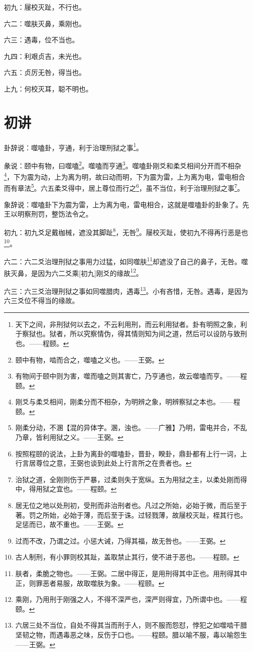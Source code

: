 \documentclass[12pt,oneside]{book}
\begin{document}
初九：屦校灭趾，不行也。

六二：噬肤灭鼻，乘刚也。

六三：遇毒，位不当也。

九四：利艰贞吉，未光也。

六五：贞厉无咎，得当也。

上九：何校灭耳，聪不明也。

\section{初讲}
卦辞说：噬嗑卦，亨通，利于治理刑狱之事\footnote{天下之间，非刑狱何以去之，不云利用刑，而云利用狱者。卦有明照之象，利于察狱也。狱者，所以究察情伪，得其情则知为间之道，然后可以设防与致刑也。——程颐。}。

彖说：颐中有物，曰噬嗑\footnote{颐中有物，啮而合之，噬嗑之义也。——王弼。}。噬嗑而亨通\footnote{有物间于颐中则为害，噬而嗑之则其害亡，乃亨通也，故云噬嗑而亨。——程颐。}。噬嗑卦刚爻和柔爻相间分开而不相杂\footnote{刚爻与柔爻相间，刚柔分而不相杂，为明辨之象，明辨察狱之本也。——程颐。}，下为震为动，上为离为明，故曰动而明，下为震为雷，上为离为电，雷电相合而有章法\footnote{刚柔分动，不溷【混的异体字。溷，浊也。——广雅】乃明，雷电并合，不乱乃章，皆利用狱之义。——王弼。}。六五柔爻得中，居上尊位而行之\footnote{按照程颐的说法，上卦为离卦的噬嗑卦，晋卦，睽卦，鼎卦都有上行一词，上行言居尊位之意，王弼也谈到此处上行言所之在贵者也。}，虽不当位，利于治理刑狱之事\footnote{治狱之道，全刚则伤于严暴，过柔则失于宽纵。五为用狱之主，以柔处刚而得中，得用狱之宜也。——程颐。}。

象辞说：噬嗑卦下为震为雷，上为离为电，雷电相合，这就是噬嗑卦的卦象了。先王以明察刑罚，整饬法令之。

初九：初九爻足戴枷械，遮没其脚趾\footnote{居无位之地以处刑初，受刑而非治刑者也。凡过之所始，必始于微，而后至于著。罚之所始，必始于薄，而后至于诛。过轻戮薄，故屦校灭趾，桎其行也。足惩而已，故不重也。——王弼。}，无咎\footnote{过而不改，乃谓之过。小惩大诫，乃得其福，故无咎也。——王弼。}。屦校灭趾，使初九不得再行恶是也\footnote{古人制刑，有小罪则校其趾，盖取禁止其行，使不进于恶也。——程颐。}。

六二：六二爻治理刑狱之事用力过猛，如同噬肤\footnote{肤者，柔脆之物也。——王弼。二居中得正，是用刑得其中正也。用刑得其中正，则罪恶者易服，故取噬肤为象。——程颐。}却遮没了自己的鼻子，无咎。噬肤灭鼻，是因为六二爻乘[初九]刚爻的缘故\footnote{乘刚，乃用刑于刚强之人，不得不深严也，深严则得宜，乃所谓中也。——程颐。}。

六三：六三爻治理刑狱之事如同噬腊肉，遇毒\footnote{六居三处不当位，自处不得其当而刑于人，则不服而怨怼，悖犯之如噬啮干腊坚韧之物，而遇毒恶之味，反伤于口也。——程颐。腊以喻不服，毒以喻怨生——王弼。}。小有吝惜，无咎。遇毒，是因为六三爻位不得当的缘故。
\end{document}
